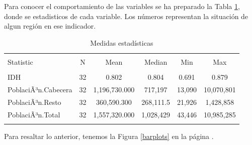 \documentclass{article}
\begin{document}
Para conocer el comportamiento de las variables se ha preparado la Tabla \ref{stats}, donde se estadisticos de cada variable. Los números representan la situación de algun región en ese indicador.

\begin{table}[!htbp] \centering 
  \caption{Medidas estadísticas} 
  \label{stats} 
\begin{tabular}{@{\extracolsep{5pt}}lccccc} 
\\[-1.8ex]\hline 
\hline \\[-1.8ex] 
Statistic & \multicolumn{1}{c}{N} & \multicolumn{1}{c}{Mean} & \multicolumn{1}{c}{Median} & \multicolumn{1}{c}{Min} & \multicolumn{1}{c}{Max} \\ 
\hline \\[-1.8ex] 
IDH & 32 & 0.802 & 0.804 & 0.691 & 0.879 \\ 
PoblaciÃ³n.Cabecera & 32 & 1,196,730.000 & 717,197 & 13,090 & 10,070,801 \\ 
PoblaciÃ³n.Resto & 32 & 360,590.300 & 268,111.5 & 21,926 & 1,428,858 \\ 
PoblaciÃ³n.Total & 32 & 1,557,320.000 & 1,028,429 & 43,446 & 10,985,285 \\ 
\hline \\[-1.8ex] 
\end{tabular} 
\end{table} %

Para resaltar lo anterior, tenemos la Figura \ref{barplots} en la página \pageref{barplots}. 
\end{document}
